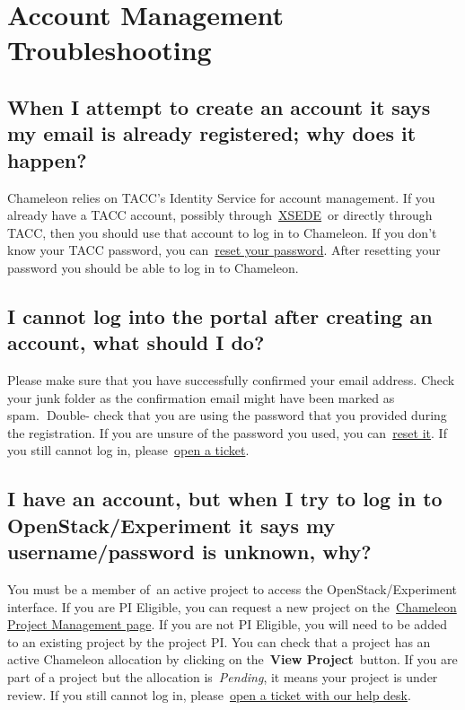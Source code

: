 \section{Account Management
Troubleshooting}\label{account-management-troubleshooting}

\subsection{When I attempt to create an account it says my email is
already registered; why does it
happen?}\label{when-i-attempt-to-create-an-account-it-says-my-email-is-already-registered-why-does-it-happen}

Chameleon relies on TACC's Identity Service for account management. If
you already have a TACC account, possibly
through~\href{http://www.xsede.org}{XSEDE}~or directly through TACC,
then you should use that account to log in to Chameleon. If you don't
know your TACC password, you
can~\href{https://www.chameleoncloud.org/password-reset}{reset your
password}. After resetting your password you should be able to log in to
Chameleon.

\subsection{I cannot log into the portal after creating an account, what
should I
do?}\label{i-cannot-log-into-the-portal-after-creating-an-account-what-should-i-do}

Please make sure that you have successfully confirmed your email
address. Check your junk folder as the confirmation email might have
been marked as spam.\textbf{~}Double- check that you are using the
password that you provided during the registration. If you are unsure of
the password you used, you
can~\href{https://www.chameleoncloud.org/user/password-reset/}{reset
it}. If you still cannot log in,
please~\href{https://www.chameleoncloud.org/user/help/ticket/new/guest/}{open
a ticket}.

\subsection{I have an account, but when I try to log in to
OpenStack/Experiment it says my username/password is unknown,
why?}\label{i-have-an-account-but-when-i-try-to-log-in-to-openstackexperiment-it-says-my-usernamepassword-is-unknown-why}

You must be a member of~an active project to access the
OpenStack/Experiment interface. If you are PI Eligible, you can request
a new project on
the~\href{https://www.chameleoncloud.org/user/projects}{Chameleon
Project Management page}. If you are not PI Eligible, you will need to
be added to an existing project by the project PI. You can check that a
project has an active Chameleon allocation by clicking on
the~\textbf{View Project}~button. If you are part of a project but the
allocation is~\emph{Pending}, it means your project is under review. If
you still cannot log in,
please~\href{https://www.chameleoncloud.org/user/help/}{open a ticket
with our help desk}.

